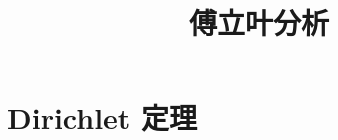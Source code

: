 \documentclass{book}
\begin{document}
\title{傅立叶分析}
\maketitle

\chapter{Dirichlet 定理}


\cite{stein2003}


\end{document}
